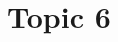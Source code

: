 \begin{comment}
\documentclass[11pt]{article}  %
\usepackage{Common/toshi}

\end{comment}



\section{Topic 6}





